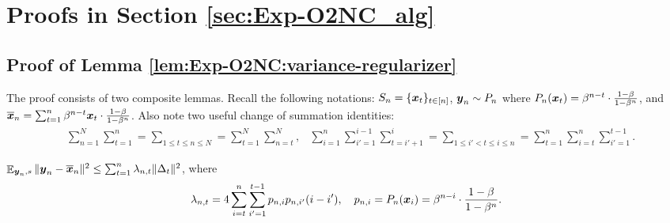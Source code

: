 \section{Proofs in Section \ref{sec:Exp-O2NC_alg}}

\subsection{Proof of Lemma \ref{lem:Exp-O2NC:variance-regularizer}}

The proof consists of two composite lemmas.
Recall the following notations: $S_n = \{{\boldsymbol{x}}_t\}_{t\in[n]}$, ${\boldsymbol{y}}_n\sim P_n$ where $P_n({\boldsymbol{x}}_t) = \beta^{n-t}\cdot \frac{1-\beta}{1-\beta^n}$, and $\overline {{\boldsymbol{x}}}_n = \sum_{t=1}^n \beta^{n-t}{\boldsymbol{x}}_t\cdot \frac{1-\beta}{1-\beta^n}$. Also note two useful change of summation identities:
\begin{align*}
    &\sum_{n=1}^N\sum_{t=1}^n = \sum_{1\le t\le n\le N} = \sum_{t=1}^N\sum_{n=t}^N, 
    &\sum_{i=1}^n\sum_{i'=1}^{i-1}\sum_{t=i'+1}^i = \sum_{1\le i'<t\le i\le n} = \sum_{t=1}^n\sum_{i=t}^n\sum_{i'=1}^{t-1}.
\end{align*}

\begin{proposition}
\label{prop:Exp-O2NC:variance-regularizer}
$\mathop{\mathbb{E}}_{{\boldsymbol{y}}_n,s}\|{\boldsymbol{y}}_n-\overline{{\boldsymbol{x}}}_n\|^2 \le \sum_{t=1}^n \lambda_{n,t}\|\Delta_t\|^2$, where
\begin{align}
    \lambda_{n,t} = 4\sum_{i=t}^n\sum_{i'=1}^{t-1} p_{n,i}p_{n,i'}(i-i'), 
    \quad p_{n,i} = P_n({\boldsymbol{x}}_i) = \beta^{n-i}\cdot\frac{1-\beta}{1-\beta^n}. 
    \label{eq:Exp-O2NC:def-lambda}
\end{align}
\end{proposition}

